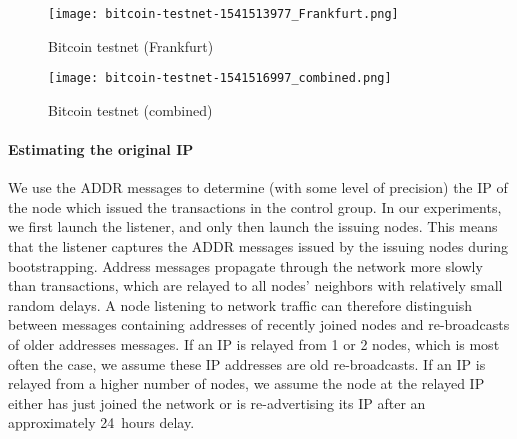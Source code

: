 \begin{figure*}
	\centering
	\begin{minipage}{0.5\textwidth}
		\centering
		\texttt{[image: bitcoin-testnet-1541513977\_Frankfurt.png]}
		\caption{Bitcoin testnet (Frankfurt)}
	\end{minipage}\hfill
	\begin{minipage}{0.5\textwidth}
		\centering
		\texttt{[image: bitcoin-testnet-1541516997\_combined.png]}
		\caption{Bitcoin testnet (combined)}
	\end{minipage}\hfill
	\label{fig:bitcoin-testnet-2}
\end{figure*}


\paragraph{Estimating the original IP}

We use the ADDR messages to determine (with some level of precision) the IP of the node which issued the transactions in the control group.
In our experiments, we first launch the listener, and only then launch the issuing nodes.
This means that the listener captures the ADDR messages issued by the issuing nodes during bootstrapping.
Address messages propagate through the network more slowly than transactions, which are relayed to all nodes' neighbors with relatively small random delays.
A node listening to network traffic can therefore distinguish between messages containing addresses of recently joined nodes and re-broadcasts of older addresses messages.
If an IP is relayed from 1 or 2 nodes, which is most often the case, we assume these IP addresses are old re-broadcasts.
If an IP is relayed from a higher number of nodes, we assume the node at the relayed IP either has just joined the network or is re-advertising its IP after an approximately 24~hours delay.

